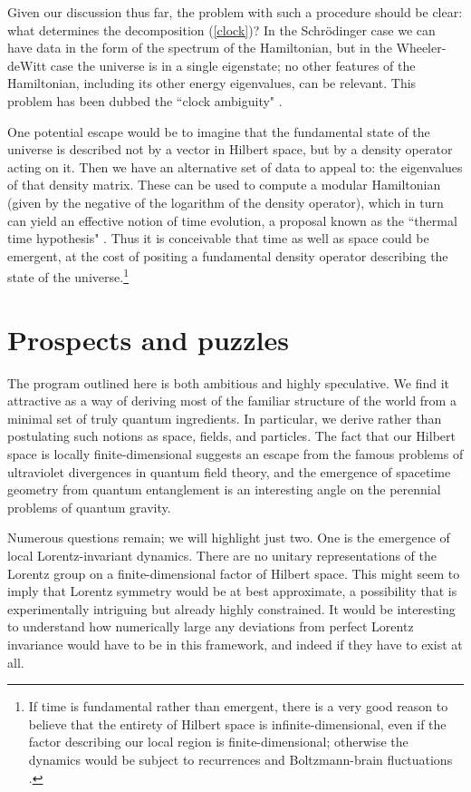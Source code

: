 \documentclass[12pt,english]{article}
\begin{document}
Given our discussion thus far, the problem with such a procedure should be clear: what determines the decomposition (\ref{clock})?
In the Schr\"odinger case we can have data in the form of the spectrum of the Hamiltonian, but in the Wheeler-deWitt case the universe is in a single eigenstate; no other features of the Hamiltonian, including its other energy eigenvalues, can be relevant.
This problem has been dubbed the ``clock ambiguity" \cite{Albrecht:2007mm}.

One potential escape would be to imagine that the fundamental state of the universe is described not by a vector in Hilbert space, but by a density operator acting on it.
Then we have an alternative set of data to appeal to: the eigenvalues of that density matrix.
These can be used to compute a modular Hamiltonian (given by the negative of the logarithm of the density operator), which in turn can yield an effective notion of time evolution, a proposal known as the ``thermal time hypothesis" \cite{Connes:1994hv}.
Thus it is conceivable that time as well as space could be emergent, at the cost of positing a fundamental density operator describing the state of the universe.\footnote{If time is fundamental rather than emergent, there is a very good reason to believe that the entirety of Hilbert space is infinite-dimensional, even if the factor describing our local region is finite-dimensional; otherwise the dynamics would be subject to recurrences and Boltzmann-brain fluctuations \cite{Carroll:2008yd}.}


\section {Prospects and puzzles}

The program outlined here is both ambitious and highly speculative.
We find it attractive as a way of deriving most of the familiar structure of the world from a minimal set of truly quantum ingredients.
In particular, we derive rather than postulating such notions as space, fields, and particles.
The fact that our Hilbert space is locally finite-dimensional suggests an escape from the famous problems of ultraviolet divergences in quantum field theory, and the emergence of spacetime geometry from quantum entanglement is an interesting angle on the perennial problems of quantum gravity.

Numerous questions remain; we will highlight just two.
One is the emergence of local Lorentz-invariant dynamics.
There are no unitary representations of the Lorentz group on a finite-dimensional factor of Hilbert space.
This might seem to imply that Lorentz symmetry would be at best approximate, a possibility that is experimentally intriguing but already highly constrained.
It would be interesting to understand how numerically large any deviations from perfect Lorentz invariance would have to be in this framework, and indeed if they have to exist at all.
\end{document}
